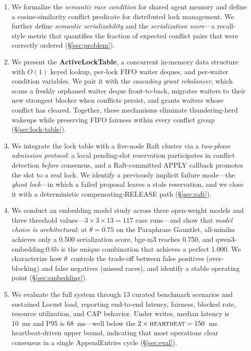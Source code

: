 \documentclass[sigconf]{acmart}
\begin{document}
\begin{enumerate}
\item We formalize the \emph{semantic race condition} for shared agent
  memory and define a cosine-similarity conflict predicate for distributed
  lock management. We further define \emph{semantic serializability} and
  the \emph{serialization score}---a recall-style metric that quantifies
  the fraction of expected conflict pairs that were correctly ordered
  (\S\ref{sec:problem}).

\item We present the \textbf{ActiveLockTable}, a concurrent in-memory data
  structure with $O(1)$ keyed lookup, per-lock FIFO waiter deques, and
  per-waiter condition variables. We pair it with the
  \emph{cascading grant rebalancer}, which scans a freshly orphaned waiter
  deque front-to-back, migrates waiters to their new strongest blocker
  when conflicts persist, and grants waiters whose conflict has cleared.
  Together, these mechanisms eliminate thundering-herd wakeups while
  preserving FIFO fairness within every conflict group
  (\S\ref{sec:lock-table}).

\item We integrate the lock table with a five-node Raft cluster via a
  \emph{two-phase admission protocol}: a local pending-slot reservation
  participates in conflict detection \emph{before} consensus, and a
  Raft-committed APPLY callback promotes the slot to a real lock. We
  identify a previously implicit failure mode---the \emph{ghost lock}---in
  which a failed proposal leaves a stale reservation, and we close it with
  a deterministic compensating-RELEASE path
  (\S\ref{sec:raft}).

\item We conduct an embedding model study across three open-weight models
  and three threshold values---\(3\times3\times13=117\) case runs---and
  show that \emph{model choice is architectural}: at $\theta{=}0.75$ on the
  Paraphrase Gauntlet, all-minilm achieves only a 0.500 serialization
  score, bge-m3 reaches 0.750, and qwen3-embedding:0.6b is the unique
  combination that achieves a perfect 1.000. We characterize how
  $\theta$~controls the trade-off between false positives (over-blocking)
  and false negatives (missed races), and identify a stable operating
  point (\S\ref{sec:embedding}).

\item We evaluate the full system through 13 curated benchmark scenarios
  and sustained Locust load, reporting end-to-end latency, fairness,
  blocked rate, resource utilization, and CAP behavior. Under writes,
  median latency is 10~ms and P95 is 68~ms---well below the
  $2\times\textsc{heartbeat}=150$~ms heartbeat-driven upper bound,
  indicating that most operations clear consensus in a single
  AppendEntries cycle (\S\ref{sec:eval}).
\end{enumerate}
\end{document}
